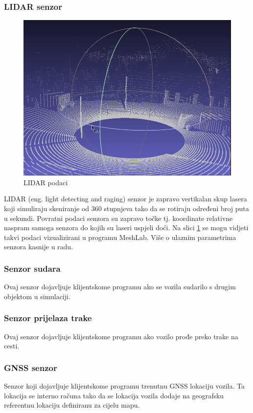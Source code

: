 \subsubsection{LIDAR senzor}
\begin{figure}[ht!]
  \centering
  \includegraphics[scale=0.5]{images/LIDAR_examaple.png}
  \caption{LIDAR podaci\cite{carla:sensors}}
  \label{fig:lidar_exmaple}
\end{figure}
LIDAR (eng. light detecting and raging) senzor je zapravo vertikalan skup lasera koji simuliraju skeniranje od 360 stupnjeva tako da se rotiraju određeni broj puta u sekundi. Povratni podaci senzora su zapravo točke tj. koordinate relativne naspram samoga senzora do kojih su laseri uspjeli doći. Na slici \ref{fig:lidar_exmaple} se mogu vidjeti takvi podaci vizualizirani u programu MeshLab. Više o ulaznim parametrima senzora kasnije u radu.

\subsubsection{Senzor sudara}
Ovaj senzor dojavljuje klijentskome programu ako se vozila sudarilo s drugim objektom u simulaciji.

\subsubsection{Senzor prijelaza trake}
Ovaj senzor dojavljuje klijentskome programu ako vozilo prođe preko trake na cesti.

\subsubsection{GNSS senzor}
Senzor koji dojavljuje klijentskome programu trenutnu GNSS lokaciju vozila. Ta lokacija se interno računa tako da se lokacija vozila dodaje na geografsku referentnu lokaciju definiranu za cijelu mapu.

